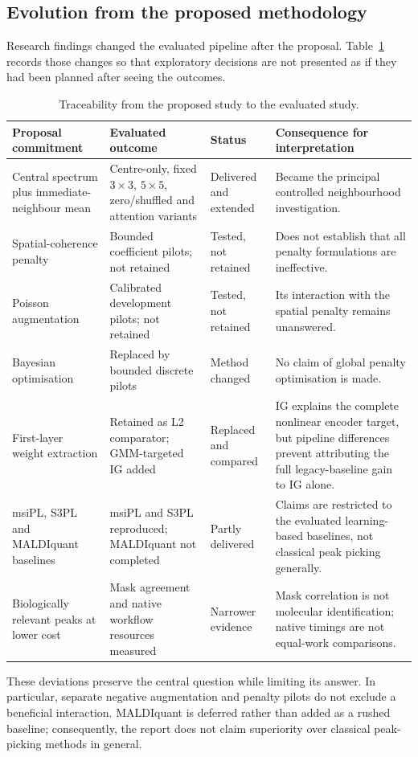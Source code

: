 \subsection{Evolution from the proposed methodology}
\label{sec:proposal_outcomes}

Research findings changed the evaluated pipeline after the proposal. Table~\ref{tab:proposal_outcomes}
records those changes so that exploratory decisions are not presented as if
they had been planned after seeing the outcomes.

\begin{table}[t]
\centering
\caption{Traceability from the proposed study to the evaluated study.}
\label{tab:proposal_outcomes}
\small
\begin{tabularx}{\textwidth}{@{}p{}p{}p{}X@{}}
\toprule
Proposal commitment & Evaluated outcome & Status & Consequence for interpretation \\
\midrule
Central spectrum plus immediate-neighbour mean & Centre-only, fixed $3\times3$, $5\times5$, zero/shuffled and attention variants & Delivered and extended & Became the principal controlled neighbourhood investigation. \\
Spatial-coherence penalty & Bounded coefficient pilots; not retained & Tested, not retained & Does not establish that all penalty formulations are ineffective. \\
Poisson augmentation & Calibrated development pilots; not retained & Tested, not retained & Its interaction with the spatial penalty remains unanswered. \\
Bayesian optimisation & Replaced by bounded discrete pilots & Method changed & No claim of global penalty optimisation is made. \\
First-layer weight extraction & Retained as L2 comparator; GMM-targeted IG added & Replaced and compared & IG explains the complete nonlinear encoder target, but pipeline differences prevent attributing the full legacy-baseline gain to IG alone. \\
msiPL, S3PL and MALDIquant baselines & msiPL and S3PL reproduced; MALDIquant not completed & Partly delivered & Claims are restricted to the evaluated learning-based baselines, not classical peak picking generally. \\
Biologically relevant peaks at lower cost & Mask agreement and native workflow resources measured & Narrower evidence & Mask correlation is not molecular identification; native timings are not equal-work comparisons. \\
\bottomrule
\end{tabularx}
\end{table}

These deviations preserve the central question while limiting its answer. In
particular, separate negative augmentation and penalty pilots do not exclude a
beneficial interaction. MALDIquant is deferred rather than added as a rushed
baseline; consequently, the report does not claim superiority over classical
peak-picking methods in general.

